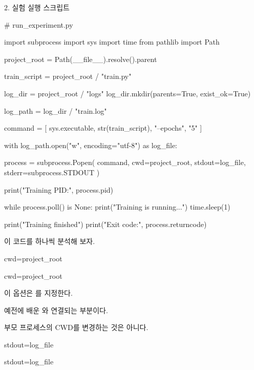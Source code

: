 2. 실험 실행 스크립트

\begin{dhkcode}
# run_experiment.py

import subprocess
import sys
import time
from pathlib import Path

project_root = Path(__file__).resolve().parent

train_script = project_root / "train.py"

log_dir = project_root / "logs"
log_dir.mkdir(parents=True, exist_ok=True)

log_path = log_dir / "train.log"

command = [
    sys.executable,
    str(train_script),
    "--epochs",
    "5"
]

with log_path.open("w", encoding="utf-8") as log_file:

    process = subprocess.Popen(
        command,
        cwd=project_root,
        stdout=log_file,
        stderr=subprocess.STDOUT
    )

    print("Training PID:", process.pid)

    while process.poll() is None:
        print("Training is running...")
        time.sleep(1)

    print("Training finished")
    print("Exit code:", process.returncode)
\end{dhkcode}

이 코드를 하나씩 분석해 보자.

\begin{dhknote}
\begin{dhksmry}[centered]
cwd=project_root
\end{dhksmry}
\end{dhknote}

\begin{dhkzsh}
cwd=project_root
\end{dhkzsh}

이 옵션은 를 지정한다.

예전에 배운 와 연결되는 부분이다.

부모 프로세스의 CWD를 변경하는 것은 아니다.

\begin{dhknote}
\begin{dhksmry}[centered]
stdout=log_file
\end{dhksmry}
\end{dhknote}

\begin{dhkzsh}
stdout=log_file
\end{dhkzsh}

